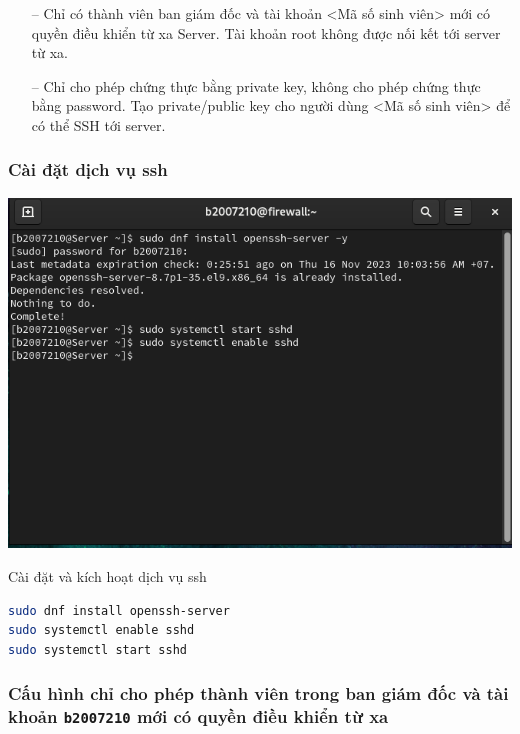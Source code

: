\documentclass[a4paper, 11pt]{article}
\begin{document}
\begin{itemize}
    \item[--] Chỉ có thành viên ban giám đốc và tài khoản <Mã số sinh viên> mới có quyền điều khiển từ xa Server. Tài khoản root không được nối kết tới server từ xa.
    \item[--] Chỉ cho phép chứng thực bằng private key, không cho phép chứng thực bằng password. Tạo private/public key cho người dùng <Mã số sinh viên> để có thể SSH tới server.
\end{itemize}

\subsubsection{Cài đặt dịch vụ ssh}

\begin{minipage}
    {\linewidth}
    \captionsetup{type=figure}
    \centering
    \includegraphics[width=\linewidth]{images/install-ssh.png}
    \caption{Cài đặt và kích hoạt dịch vụ ssh}
    \label{figure:install-ssh}
\end{minipage}
\begin{lstlisting}[language=bash, caption=Cài đặt và kích hoạt dịch vụ ssh]
sudo dnf install openssh-server
sudo systemctl enable sshd
sudo systemctl start sshd
\end{lstlisting}

\subsubsection{Cấu hình chỉ cho phép thành viên trong ban giám đốc và tài khoản \texttt{b2007210} mới có quyền điều khiển từ xa}
\end{document}
